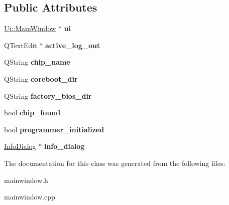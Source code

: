\subsection*{Public Attributes}
\begin{DoxyCompactItemize}
\item 
\hypertarget{classMainWindow_a35466a70ed47252a0191168126a352a5}{\hyperlink{classUi_1_1MainWindow}{Ui\-::\-Main\-Window} $\ast$ {\bfseries ui}}\label{classMainWindow_a35466a70ed47252a0191168126a352a5}

\item 
\hypertarget{classMainWindow_acb081a83000d665b349943e012e14c67}{Q\-Text\-Edit $\ast$ {\bfseries active\-\_\-log\-\_\-out}}\label{classMainWindow_acb081a83000d665b349943e012e14c67}

\item 
\hypertarget{classMainWindow_a898a7f35b61cbb1668be8ab027ee6c87}{Q\-String {\bfseries chip\-\_\-name}}\label{classMainWindow_a898a7f35b61cbb1668be8ab027ee6c87}

\item 
\hypertarget{classMainWindow_af3641fe0d6d71b6fe3ada1a7fd9f0abe}{Q\-String {\bfseries coreboot\-\_\-dir}}\label{classMainWindow_af3641fe0d6d71b6fe3ada1a7fd9f0abe}

\item 
\hypertarget{classMainWindow_aa9b9e4aa3b2225b372c723f900fd4840}{Q\-String {\bfseries factory\-\_\-bios\-\_\-dir}}\label{classMainWindow_aa9b9e4aa3b2225b372c723f900fd4840}

\item 
\hypertarget{classMainWindow_afe8040a491f4140c36c4d1cca2a63390}{bool {\bfseries chip\-\_\-found}}\label{classMainWindow_afe8040a491f4140c36c4d1cca2a63390}

\item 
\hypertarget{classMainWindow_ade45675d9c29a12f3891c0e5ffb6b520}{bool {\bfseries programmer\-\_\-initialized}}\label{classMainWindow_ade45675d9c29a12f3891c0e5ffb6b520}

\item 
\hypertarget{classMainWindow_add53793006fe49da98302a2f0df4f34f}{\hyperlink{classInfoDialog}{Info\-Dialog} $\ast$ {\bfseries info\-\_\-dialog}}\label{classMainWindow_add53793006fe49da98302a2f0df4f34f}

\end{DoxyCompactItemize}


The documentation for this class was generated from the following files\-:\begin{DoxyCompactItemize}
\item 
mainwindow.\-h\item 
mainwindow.\-cpp\end{DoxyCompactItemize}
